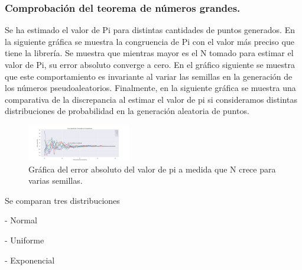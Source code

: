 \documentclass{rbf}
\begin{document}
\subsubsection{Comprobación del teorema de números grandes.}
Se ha estimado el valor de Pi para distintas cantidades de puntos generados. En la siguiente gráfica se muestra la congruencia de Pi con el valor más preciso que tiene la librería. Se muestra que mientras mayor es el N tomado para estimar el valor de Pi, su error absoluto converge a cero.
En el gráfico siguiente se muestra que este comportamiento es invariante al variar las semillas en la generación de los números pseudoaleatorios.
Finalmente, en la siguiente gráfica se muestra una comparativa de la discrepancia al estimar el valor de pi si consideramos distintas distribuciones de probabilidad en la generación aleatoria de puntos.
\begin{figure}[tbp!]
 \centering
  \includegraphics[width=0.4\textwidth]{figures/errors_uniforme.png}
	\caption{Gráfica del error absoluto del valor de pi a medida que N crece para varias semillas.}
 \label{buff}
\end{figure}

Se comparan tres distribuciones

- Normal

- Uniforme

- Exponencial 
\end{document}
